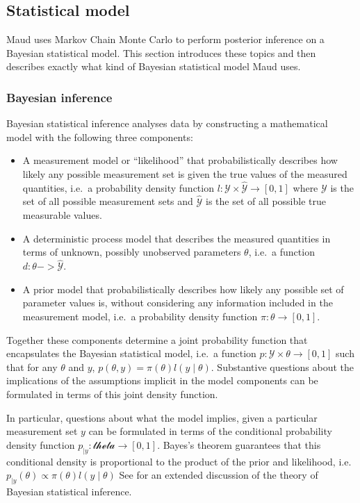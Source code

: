 \documentclass[journal=asbcd6,manuscript=article,layout=traditional]{achemso}
\begin{document}
\subsection{Statistical model}\label{statistical-model}

Maud uses Markov Chain Monte Carlo to perform posterior inference on a
Bayesian statistical model. This section introduces these topics and
then describes exactly what kind of Bayesian statistical model Maud
uses.

\subsubsection{Bayesian inference}\label{bayesian-inference}

Bayesian statistical inference analyses data by constructing a
mathematical model with the following three components:

\begin{itemize}
\item
  A measurement model or ``likelihood'' that probabilistically describes
  how likely any possible measurement set is given the true values of
  the measured quantities, i.e.~a probability density function \(l:
  \mathcal{Y}\times\hat{\mathcal{Y}} \rightarrow [0, 1]\) where
  \(\mathcal{Y}\) is the set of all possible measurement sets and
  \(\hat{\mathcal{Y}}\) is the set of all possible true measurable
  values.
\item
  A deterministic process model that describes the measured quantities
  in terms of unknown, possibly unobserved parameters \(\theta\), i.e.~a
  function \(d:
  \mathcal{\theta} -> \hat{\mathcal{Y}}\).
\item
  A prior model that probabilistically describes how likely any possible
  set of parameter values is, without considering any information
  included in the measurement model, i.e.~a probability density function
  \(\pi : \mathcal{\theta}
  \rightarrow [0, 1]\).
\end{itemize}

Together these components determine a joint probability function that
encapsulates the Bayesian statistical model, i.e.~a function \(p:
\mathcal{Y}\times\mathcal{\theta}\rightarrow[0,1]\) such that for any
\(\theta\) and \(y\), \(p(\theta, y) = \pi(\theta)l(y\mid\theta)\).
Substantive questions about the implications of the assumptions implicit
in the model components can be formulated in terms of this joint density
function.

In particular, questions about what the model implies, given a
particular measurement set \(y\) can be formulated in terms of the
conditional probability density function
\(p_{\mid y}:\mathcal{theta}\rightarrow[0,1]\). Bayes's theorem
guarantees that this conditional density is proportional to the product
of the prior and likelihood, i.e.~\(p_{\mid y}(\theta) \propto
\pi(\theta)l(y\mid\theta)\) See \citep[Ch
1]{gelmanBayesianDataAnalysis2020a} for an extended discussion of the
theory of Bayesian statistical inference.
\end{document}
